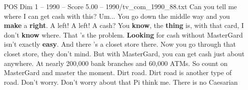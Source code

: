 \begin{textsample}{POS Dim 1 – 1990 – Score 5.00 – 1990/tv\_com\_1990\_88.txt}  \label{ex:f1_pos_056}
Can you tell me where I can get cash with this?
Um...
You go down the middle way and you \textbf{make} a \textbf{right}.
A left!
A left!
A cash?
You \textbf{know}, the \textbf{thing} is, with that card, I don't \textbf{know} where.
That 's the problem. \textbf{Looking} for cash without MasterGard isn't exactly \textbf{easy}.
And there 's a closet store there.
Now you go through that closet store, they don't mind.
But with MasterGard, you can get cash just about anywhere.
At nearly 200,000 bank branches and 60,000 ATMs.
So count on MasterGard and master the moment.
Dirt road.
Dirt road is another type of road.
Don't worry.
Don't worry about that Pi think me.
There is no Caesarian

\end{textsample}
